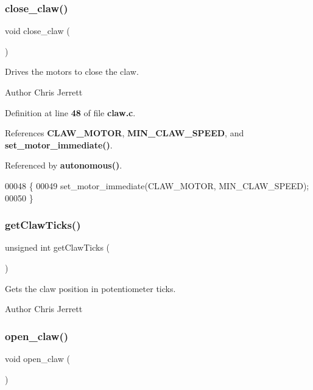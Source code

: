 \subsubsection{close\+\_\+claw()}
{\footnotesize\ttfamily void close\+\_\+claw (\begin{DoxyParamCaption}{ }\end{DoxyParamCaption})}



Drives the motors to close the claw. 

\begin{DoxyAuthor}{Author}
Chris Jerrett 
\end{DoxyAuthor}


Definition at line \textbf{ 48} of file \textbf{ claw.\+c}.



References \textbf{ C\+L\+A\+W\+\_\+\+M\+O\+T\+OR}, \textbf{ M\+I\+N\+\_\+\+C\+L\+A\+W\+\_\+\+S\+P\+E\+ED}, and \textbf{ set\+\_\+motor\+\_\+immediate()}.



Referenced by \textbf{ autonomous()}.


\begin{DoxyCode}
00048                   \{
00049   set_motor_immediate(CLAW_MOTOR, MIN_CLAW_SPEED);
00050 \}
\end{DoxyCode}
\mbox{\label{claw_8h_addd2004effae7c94400aed1fe6a90ead}} 
\subsubsection{get\+Claw\+Ticks()}
{\footnotesize\ttfamily unsigned int get\+Claw\+Ticks (\begin{DoxyParamCaption}{ }\end{DoxyParamCaption})}



Gets the claw position in potentiometer ticks. 

\begin{DoxyAuthor}{Author}
Chris Jerrett 
\end{DoxyAuthor}
\mbox{\label{claw_8h_a03023ca28f671b9fa7bac07782ccd8c1}} 
\subsubsection{open\+\_\+claw()}
{\footnotesize\ttfamily void open\+\_\+claw (\begin{DoxyParamCaption}{ }\end{DoxyParamCaption})}



